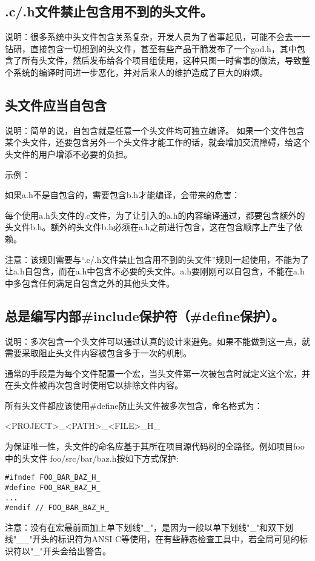 \subsection{.c/.h文件禁止包含用不到的头文件。}
说明：很多系统中头文件包含关系复杂，开发人员为了省事起见，可能不会去一一钻研，直接包含一切想到的头文件，甚至有些产品干脆发布了一个god.h，其中包含了所有头文件，然后发布给各个项目组使用，这种只图一时省事的做法，导致整个系统的编译时间进一步恶化，并对后来人的维护造成了巨大的麻烦。


\subsection{头文件应当自包含}
说明：简单的说，自包含就是任意一个头文件均可独立编译。 如果一个文件包含某个头文件，还要包含另外一个头文件才能工作的话，就会增加交流障碍，给这个头文件的用户增添不必要的负担。

示例：

如果a.h不是自包含的，需要包含b.h才能编译，会带来的危害：

每个使用a.h头文件的.c文件，为了让引入的a.h的内容编译通过，都要包含额外的头文件b.h。额外的头文件b.h必须在a.h之前进行包含，这在包含顺序上产生了依赖。

注意：该规则需要与“.c/.h文件禁止包含用不到的头文件”规则一起使用，不能为了让a.h自包含，而在a.h中包含不必要的头文件。a.h要刚刚可以自包含，不能在a.h中多包含任何满足自包含之外的其他头文件。


\subsection{总是编写内部\#include保护符（\#define保护）。}
说明：多次包含一个头文件可以通过认真的设计来避免。如果不能做到这一点，就需要采取阻止头文件内容被包含多于一次的机制。

通常的手段是为每个文件配置一个宏，当头文件第一次被包含时就定义这个宏，并在头文件被再次包含时使用它以排除文件内容。

所有头文件都应该使用\#define防止头文件被多次包含，命名格式为：

<PROJECT>\_<PATH>\_<FILE>\_H\_

为保证唯一性，头文件的命名应基于其所在项目源代码树的全路径。例如项目foo中的头文件 foo/src/bar/baz.h按如下方式保护:
\begin{verbatim}
#ifndef FOO_BAR_BAZ_H_
#define FOO_BAR_BAZ_H_
...
#endif // FOO_BAR_BAZ_H_
\end{verbatim}

注意：没有在宏最前面加上单下划线"\_"，是因为一般以单下划线"\_"和双下划线"\_\_"开头的标识符为ANSI C等使用，在有些静态检查工具中，若全局可见的标识符以"\_"开头会给出警告。

